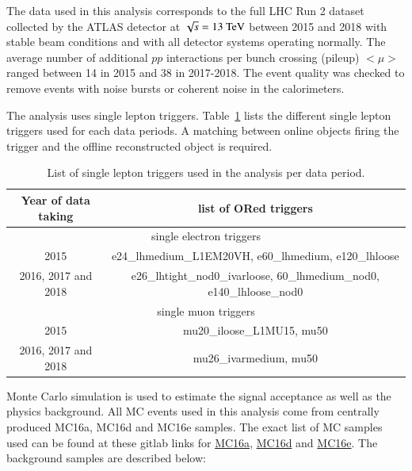 %
The data used in this analysis corresponds to the full LHC Run 2 dataset collected by the ATLAS detector at $\sqrt{s}=13~\text{TeV}$
between 2015 and 2018 with stable beam conditions and with all detector systems operating normally.
The average number of additional $pp$ interactions per bunch crossing (pileup) $<\mu>$ ranged between 14 in 2015 and 38 in 2017-2018.
The event quality was checked to remove events with noise bursts or coherent noise in the calorimeters.

The analysis uses single lepton triggers. Table~\ref{tab:slep_trigger} lists the different single lepton triggers used for each data periods.
A matching between online objects firing the trigger and the offline reconstructed object is required.

\begin{table}[!hbt]
\begin{center}
\begin{tabular}{c|c}
\hline
Year of data taking & list of ORed triggers \\
\hline \hline
\multicolumn{2}{c}{single electron triggers} \\
\hline \hline
2015 & e24\_lhmedium\_L1EM20VH, e60\_lhmedium, e120\_lhloose  \\
2016, 2017 and 2018 & e26\_lhtight\_nod0\_ivarloose, 60\_lhmedium\_nod0, e140\_lhloose\_nod0 \\
\hline \hline
\multicolumn{2}{c}{single muon triggers} \\
\hline \hline
2015 & mu20\_iloose\_L1MU15, mu50 \\
2016, 2017 and 2018 & mu26\_ivarmedium, mu50 \\
\hline
\end{tabular}
\caption{List of single lepton triggers used in the analysis per data period.}
\label{tab:slep_trigger}
\end{center}
\end{table}

Monte Carlo simulation is used to estimate the signal acceptance as well as the physics background.
All MC events used in this analysis come from centrally produced MC16a, MC16d and MC16e samples.
The exact list of MC samples used can be found at these gitlab links for 
\href{https://gitlab.cern.ch/atlas-phys/exot/hqt/bsm_h_4t/common-framework/-/blob/master/preProd/mc16a_SM4tops.py}{MC16a}, 
\href{https://gitlab.cern.ch/atlas-phys/exot/hqt/bsm_h_4t/common-framework/-/blob/master/preProd/mc16d_SM4tops.py}{MC16d} 
and \href{https://gitlab.cern.ch/atlas-phys/exot/hqt/bsm_h_4t/common-framework/-/blob/master/preProd/mc16e_SM4tops.py}{MC16e}.  The background samples are described below:

